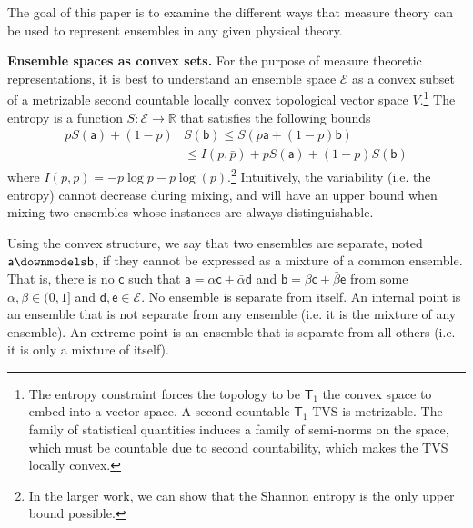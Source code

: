 \documentclass[10pt,twocolumn, nofootinbib]{revtex4-2}
\newcommand{\ens}[1][e] {\mathsf{#1}} %
\newcommand{\Ens}[1][E] {\mathcal{#1}} %
\def\separate{\downmodels}
\begin{document}
The goal of this paper is to examine the different ways that measure theory can be used to represent ensembles in any given physical theory.


\textbf{Ensemble spaces as convex sets.} For the purpose of measure theoretic representations, it is best to understand an ensemble space $\Ens$ as a convex subset of a metrizable second countable locally convex topological vector space $V$.\footnote{The entropy constraint forces the topology to be $\mathsf{T}_1$ the convex space to embed into a vector space. A second countable $\mathsf{T}_1$ TVS is metrizable. The family of statistical quantities induces a family of semi-norms on the space, which must be countable due to second countability, which makes the TVS locally convex.} The entropy is a function $S : \Ens \to \mathbb{R}$ that satisfies the following bounds
\begin{equation}
	\begin{aligned}
		p S(\ens[a]) + (1-p) &S(\ens[b]) \leq S(p \ens[a] + (1-p) \ens[b]) \\
		&\leq I(p,\bar{p}) + p S(\ens[a]) + (1-p) S(\ens[b])
	\end{aligned}
\end{equation}
where $I(p,\bar{p}) = - p \log p - \bar{p} \log(\bar{p})$.\footnote{In the larger work, we can show that the Shannon entropy is the only upper bound possible.}  Intuitively, the variability (i.e. the entropy) cannot decrease during mixing, and will have an upper bound when mixing two ensembles whose instances are always distinguishable.

Using the convex structure, we say that two ensembles are separate, noted $\ens[a] \separate \ens[b]$, if they cannot be expressed as a mixture of a common ensemble. That is, there is no $\ens[c]$ such that $\ens[a] = \alpha \ens[c] + \bar{\alpha} \ens[d]$ and $\ens[b] = \beta \ens[c] + \bar{\beta} \ens$ from some $\alpha, \beta \in (0,1]$ and $\ens[d],\ens \in \Ens$. No ensemble is separate from itself. An internal point is an ensemble that is not separate from any ensemble (i.e. it is the mixture of any ensemble). An extreme point is an ensemble that is separate from all others (i.e. it is only a mixture of itself).
\end{document}
